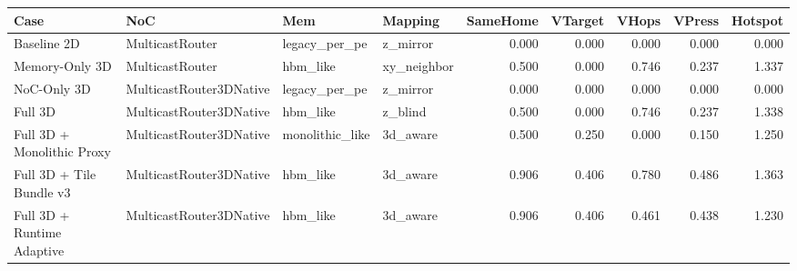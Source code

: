 \begin{tabular}{l l l l r r r r r}
\hline
Case & NoC & Mem & Mapping & SameHome & VTarget & VHops & VPress & Hotspot \\
\hline
Baseline 2D & MulticastRouter & legacy\_per\_pe & z\_mirror & 0.000 & 0.000 & 0.000 & 0.000 & 0.000 \\
Memory-Only 3D & MulticastRouter & hbm\_like & xy\_neighbor & 0.500 & 0.000 & 0.746 & 0.237 & 1.337 \\
NoC-Only 3D & MulticastRouter3DNative & legacy\_per\_pe & z\_mirror & 0.000 & 0.000 & 0.000 & 0.000 & 0.000 \\
Full 3D & MulticastRouter3DNative & hbm\_like & z\_blind & 0.500 & 0.000 & 0.746 & 0.237 & 1.338 \\
Full 3D + Monolithic Proxy & MulticastRouter3DNative & monolithic\_like & 3d\_aware & 0.500 & 0.250 & 0.000 & 0.150 & 1.250 \\
Full 3D + Tile Bundle v3 & MulticastRouter3DNative & hbm\_like & 3d\_aware & 0.906 & 0.406 & 0.780 & 0.486 & 1.363 \\
Full 3D + Runtime Adaptive & MulticastRouter3DNative & hbm\_like & 3d\_aware & 0.906 & 0.406 & 0.461 & 0.438 & 1.230 \\
\hline
\end{tabular}
